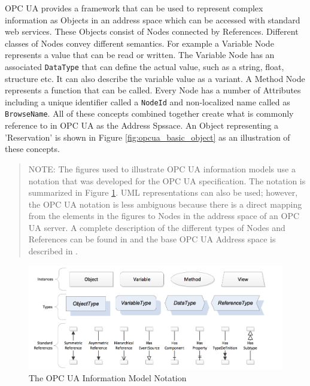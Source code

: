 OPC UA provides a framework that can be used to represent complex information as Objects in an address space which can be accessed with standard web services. These Objects consist of Nodes connected by References. Different classes of Nodes convey different semantics. For example a Variable Node represents a value that can be read or written. The Variable Node has an associated \texttt{DataType} that can define the actual value, such as a string, float, structure etc. It can also describe the variable value as a variant. A Method Node represents a function that can be called. Every Node has a number of Attributes including a unique identifier called a \texttt{NodeId} and non-localized name called as \texttt{BrowseName}. All of these concepts combined together create what is commonly reference to in OPC UA as the Address Spssace. An Object representing a 'Reservation' is shown in Figure \ref{fig:opcua_basic_object} as an illustration of these concepts.

\begin{quote}
\footnotesize
NOTE: The figures used to illustrate OPC UA information models use a notation that was developed for the OPC UA specification. The notation is summarized in Figure \ref{fig:opc_ua_notation}. UML representations can also be used; however, the OPC UA notation is less ambiguous because there is a direct mapping from the elements in the figures to Nodes in the address space of an OPC UA server. A complete description of the different types of Nodes and References can be found in \cite{UAPart3} and the base OPC UA Address space is described in \cite{UAPart5}.
\end{quote}

\begin{figure}[h]
  \centering
  \includegraphics[width=1.0\textwidth]{diagrams/OpcInfoModelNotation.png}
  \caption{The OPC UA Information Model Notation}
  \label{fig:opc_ua_notation}
\end{figure}

